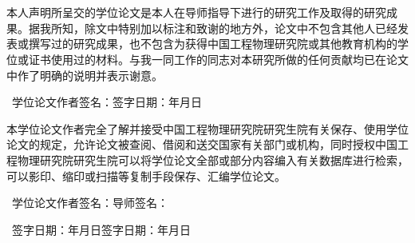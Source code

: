 \chapter*{\bfseries\xiaosan{}}
\vspace{1em}

本人声明所呈交的学位论文是本人在导师指导下进行的研究工作及取得的研究成果。据我所知，除文中特别加以标注和致谢的地方外，论文中不包含其他人已经发表或撰写过的研究成果，也不包含为获得中国工程物理研究院或其他教育机构的学位或证书使用过的材料。与我一同工作的同志对本研究所做的任何贡献均已在论文中作了明确的说明并表示谢意。

\vspace{2\baselineskip}
\noindent~学位论文作者签名：\hfill 签字日期：\hspace{2.5em}年\hspace{1.5em}月\hspace{1.5em}日

\vspace{9\baselineskip}
\begin{center}\bfseries\xiaosan{}\end{center}
\vspace{1.5em}

本学位论文作者完全了解并接受中国工程物理研究院研究生院有关保存、使用学位论文的规定，允许论文被查阅、借阅和送交国家有关部门或机构，同时授权中国工程物理研究院研究生院可以将学位论文全部或部分内容编入有关数据库进行检索，可以影印、缩印或扫描等复制手段保存、汇编学位论文。

\vspace{2\baselineskip}
\noindent~学位论文作者签名：\hfill 导师签名：\hspace{8.5em}

\vspace{1\baselineskip}
\noindent~签字日期：\hspace{2.5em}年\hspace{1.5em}月\hspace{1.5em}日\hfill 签字日期：\hspace{2.5em}年\hspace{1.5em}月\hspace{1.5em}日